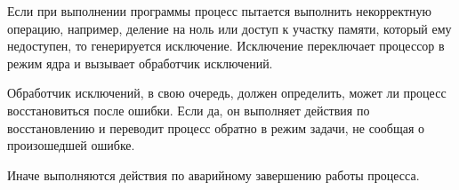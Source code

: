 Если при выполнении программы процесс пытается выполнить некорректную операцию, например, деление на ноль или доступ к участку памяти, который ему недоступен, то генерируется исключение. Исключение переключает процессор в режим ядра и вызывает обработчик исключений.

Обработчик исключений, в свою очередь, должен определить, может ли процесс восстановиться после ошибки. Если да, он выполняет действия по восстановлению и переводит процесс обратно в режим задачи, не сообщая о произошедшей ошибке.

Иначе выполняются действия по аварийному завершению работы процесса.